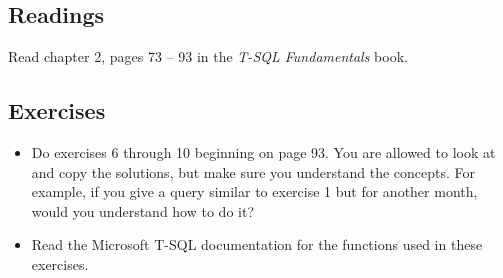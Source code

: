 \documentclass{article}
\begin{document}
        \subsection{Readings}
        Read chapter 2, pages 73 -- 93 in the \textit{T-SQL Fundamentals} book.

        
        \subsection{Exercises}

        \begin{itemize}
        \item Do exercises 6 through 10 beginning on page 93. You are allowed to look at and copy the solutions, but make sure you understand the concepts. For example, if you give a query similar to exercise 1 but for another month, would you understand how to do it?

        \item Read the Microsoft T-SQL documentation for the functions used in these exercises.
        \end{itemize}
\end{document}
